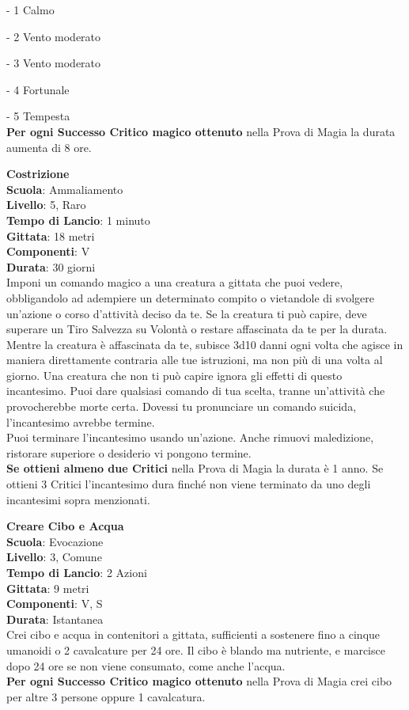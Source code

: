 \begin{multicols}{2}
- 1 Calmo

- 2 Vento moderato

- 3 Vento moderato

- 4 Fortunale

- 5 Tempesta\\

\textbf{Per ogni Successo Critico magico ottenuto} nella Prova di Magia la durata aumenta di 8 ore.

\medskip\textbf{Costrizione}\\
\textbf{Scuola}: Ammaliamento\\
\textbf{Livello}: 5, Raro\\
\textbf{Tempo di Lancio}: 1 minuto\\
\textbf{Gittata}: 18 metri\\
\textbf{Componenti}: V\\
\textbf{Durata}: 30 giorni\\
Imponi un comando magico a una creatura a gittata che puoi vedere, obbligandolo ad adempiere un determinato compito o vietandole di svolgere un'azione o corso d'attività deciso da te. Se la creatura ti può capire, deve superare un Tiro Salvezza su Volontà o restare affascinata da te per la durata. Mentre la creatura è affascinata da te, subisce 3d10 danni ogni volta che agisce in maniera direttamente contraria alle tue istruzioni, ma non più di una volta al giorno. Una creatura che non ti può capire ignora gli effetti di questo incantesimo. Puoi dare qualsiasi comando di tua scelta, tranne un'attività che provocherebbe morte certa. Dovessi tu pronunciare un comando suicida, l'incantesimo avrebbe termine.\\
Puoi terminare l'incantesimo usando un'azione. Anche rimuovi maledizione, ristorare superiore o desiderio vi pongono termine.\\
\textbf{Se ottieni almeno due Critici} nella Prova di Magia la durata è 1 anno. Se ottieni 3 Critici l'incantesimo dura finché non viene terminato da uno degli incantesimi sopra menzionati.

\medskip\textbf{Creare Cibo e Acqua}\\
\textbf{Scuola}: Evocazione\\
\textbf{Livello}: 3, Comune\\
\textbf{Tempo di Lancio}: 2 Azioni\\
\textbf{Gittata}: 9 metri\\
\textbf{Componenti}: V, S\\
\textbf{Durata}: Istantanea\\
Crei cibo e acqua in contenitori a gittata, sufficienti a sostenere fino a cinque umanoidi o 2 cavalcature per 24 ore. Il cibo è blando ma nutriente, e marcisce dopo 24 ore se non viene consumato, come anche l'acqua.\\
\textbf{Per ogni Successo Critico magico ottenuto} nella Prova di Magia crei cibo per altre 3 persone oppure 1 cavalcatura.


\end{multicols}
